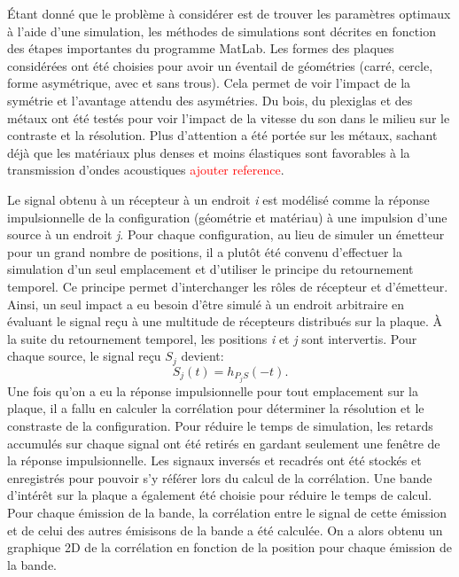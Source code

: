 \documentclass[conference]{IEEEtran}
\begin{document}

Étant donné que le problème à considérer est de trouver les paramètres 
optimaux à l'aide d'une simulation, les méthodes de simulations sont décrites
en fonction des étapes importantes du programme MatLab.
Les formes des plaques considérées ont été choisies pour avoir un éventail de 
géométries (carré, cercle, forme asymétrique, avec et sans trous). 
Cela permet de voir l'impact de la symétrie et l'avantage attendu des asymétries. 
Du bois, du plexiglas et des métaux ont été testés pour voir l'impact de la 
vitesse du son dans le milieu sur le contraste et la résolution. 
Plus d'attention a été portée sur les métaux, sachant déjà que les matériaux plus 
denses et moins élastiques sont favorables à  la transmission d'ondes acoustiques 
\textcolor{red}{ajouter reference}.

Le signal obtenu à un récepteur à un endroit \textit{i} est modélisé comme la réponse 
impulsionnelle de la configuration (géométrie et matériau) à une impulsion d'une source
à un endroit \textit{j}. 
Pour chaque configuration, au lieu de simuler un émetteur pour un grand nombre de 
positions, il a plutôt été convenu d'effectuer la simulation d'un seul emplacement 
et d'utiliser le principe du retournement temporel. 
Ce principe permet d'interchanger les rôles de récepteur et d'émetteur. 
Ainsi, un seul impact a eu besoin d'être simulé à un endroit arbitraire en évaluant 
le signal reçu à une multitude de récepteurs distribués sur la plaque. 
À la suite du retournement temporel, les positions \textit{i} et \textit{j} 
sont intervertis. 
Pour chaque source, le signal reçu \textit{$S_j$} devient:
\[S_j(t)=h_{P_jS}(-t).\]
Une fois qu'on a eu la réponse impulsionnelle pour tout emplacement sur la plaque, il a 
fallu en calculer la corrélation pour déterminer la résolution et le constraste de la
configuration. 
Pour réduire le temps de simulation, les retards accumulés sur chaque signal ont été 
retirés en gardant seulement une fenêtre de la réponse impulsionnelle. 
Les signaux inversés et recadrés ont été stockés et enregistrés pour pouvoir s'y référer 
lors du calcul de la corrélation. 
Une bande d'intérêt sur la plaque a également été choisie pour réduire le temps de 
calcul. 
Pour chaque émission de la bande, la corrélation entre le signal de cette émission et
de celui des autres émisisons de la bande a été calculée. 
On a alors obtenu un graphique 2D de la corrélation en fonction de la position pour 
chaque émission de la bande. 
\end{document}
